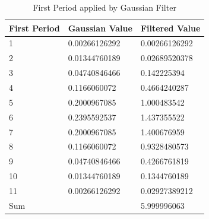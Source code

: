 \documentclass[draft,dvipsnames]{drexel-thesis}
\begin{document}
\begin{thesis}
\begin{table}[!t]
\centering
\caption{First Period applied by Gaussian Filter}
\label{tbl:first_period}
\begin{small}
\begin{tabular}{|l|ll|}
\hline
First Period & \multicolumn{1}{l|}{Gaussian Value} & Filtered Value \\ \hline
1            & \multicolumn{1}{l|}{0.00266126292}  & 0.00266126292  \\
2            & \multicolumn{1}{l|}{0.01344760189}  & 0.02689520378  \\
3            & \multicolumn{1}{l|}{0.04740846466}  & 0.142225394    \\
4            & \multicolumn{1}{l|}{0.1166060072}   & 0.4664240287   \\
5            & \multicolumn{1}{l|}{0.2000967085}   & 1.000483542    \\
6            & \multicolumn{1}{l|}{0.2395592537}   & 1.437355522    \\
7            & \multicolumn{1}{l|}{0.2000967085}   & 1.400676959    \\
8            & \multicolumn{1}{l|}{0.1166060072}   & 0.9328480573   \\
9            & \multicolumn{1}{l|}{0.04740846466}  & 0.4266761819   \\
10           & \multicolumn{1}{l|}{0.01344760189}  & 0.1344760189   \\
11           & \multicolumn{1}{l|}{0.00266126292}  & 0.02927389212  \\ \hline
\multicolumn{2}{|l|}{Sum}                          & 5.999996063    \\ \hline
\end{tabular}
\end{small}
\end{table}


\end{thesis}
\end{document}
